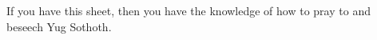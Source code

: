 \documentclass[green]{guildcamp4}
\begin{document}
\name{\gPrayYog{}}

If you have this sheet, then you have the knowledge of how to pray to and beseech Yug Sothoth.
\end{document}
